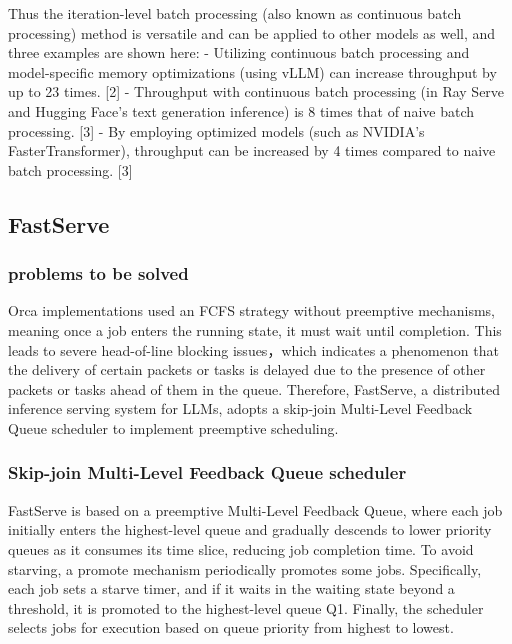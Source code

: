 \documentclass[conference]{IEEEtran}
\begin{document}
Thus the iteration-level batch processing (also known as continuous batch processing) method is versatile and can be applied to other models as well, and three examples are shown here:
- Utilizing continuous batch processing and model-specific memory optimizations (using vLLM) can increase throughput by up to 23 times. [2]
- Throughput with continuous batch processing (in Ray Serve and Hugging Face's text generation inference) is 8 times that of naive batch processing. [3]
- By employing optimized models (such as NVIDIA's FasterTransformer), throughput can be increased by 4 times compared to naive batch processing. [3]

\subsection{FastServe}
\subsubsection{problems to be solved}

Orca implementations used an FCFS strategy without preemptive mechanisms, meaning once a job enters the running state, it must wait until completion. This leads to severe head-of-line blocking issues，which indicates a phenomenon that the delivery of certain packets or tasks is delayed due to the presence of other packets or tasks ahead of them in the queue. Therefore, FastServe, a distributed inference serving system for LLMs, adopts a skip-join Multi-Level Feedback Queue scheduler to implement preemptive scheduling.
\subsubsection{Skip-join Multi-Level Feedback Queue scheduler}


FastServe is based on a preemptive Multi-Level Feedback Queue, where each job initially enters the highest-level queue and gradually descends to lower priority queues as it consumes its time slice, reducing job completion time. To avoid starving, a promote mechanism periodically promotes some jobs. Specifically, each job sets a starve timer, and if it waits in the waiting state beyond a threshold, it is promoted to the highest-level queue Q1. Finally, the scheduler selects jobs for execution based on queue priority from highest to lowest.
\end{document}
